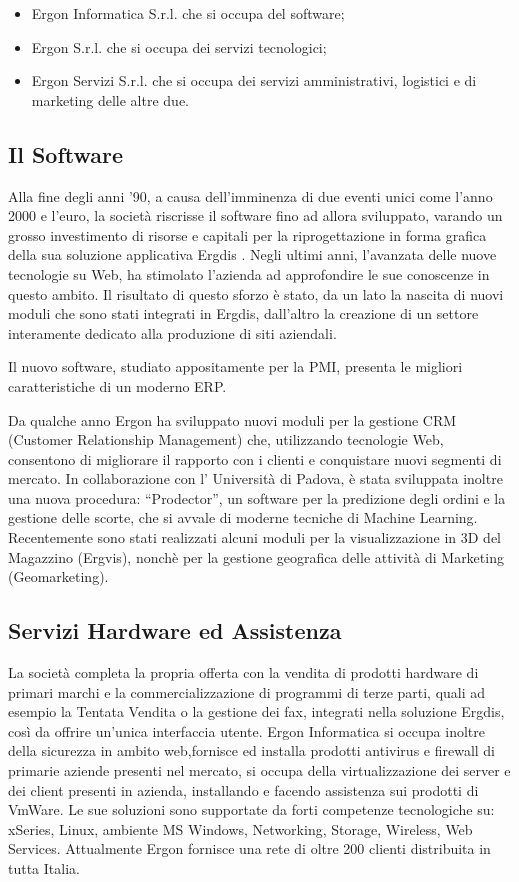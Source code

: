 \begin{itemize}
\item Ergon Informatica S.r.l. che si occupa del software;
\item Ergon S.r.l. che si occupa dei servizi tecnologici;
\item Ergon Servizi S.r.l. che si occupa dei servizi amministrativi, logistici e di marketing delle altre due.
\end{itemize}
  
\subsection*{Il Software}
Alla fine degli anni '90, a causa dell'imminenza di due eventi unici come l'anno 2000 e l'euro, la società riscrisse 
il software fino ad allora sviluppato, varando un grosso investimento di risorse e capitali per la riprogettazione in 
forma grafica della sua soluzione applicativa Ergdis .
Negli ultimi anni, l'avanzata delle nuove tecnologie su Web, ha stimolato l'azienda ad approfondire le sue conoscenze 
in questo ambito. Il risultato di questo sforzo è stato, da un lato la nascita di nuovi moduli che sono stati integrati 
in Ergdis, dall'altro la creazione di un settore interamente dedicato alla produzione di siti aziendali. 

Il nuovo software, studiato appositamente per la PMI, presenta le migliori caratteristiche di un moderno ERP.

Da qualche anno Ergon ha sviluppato nuovi moduli per la gestione CRM (Customer Relationship Management) che, 
utilizzando tecnologie Web, consentono di migliorare il rapporto con i clienti e conquistare nuovi segmenti di mercato. 
In collaborazione con l’ Università di Padova, è stata sviluppata inoltre una nuova procedura: “Prodector”, un software 
per la predizione degli ordini e la gestione delle scorte, che si avvale di moderne tecniche di Machine Learning.
Recentemente sono stati realizzati alcuni moduli per la visualizzazione in 3D del Magazzino (Ergvis), 
nonchè per la gestione geografica delle attività di Marketing (Geomarketing).

\subsection*{Servizi Hardware ed Assistenza}
La società completa la propria offerta con la vendita di prodotti hardware di primari marchi e la commercializzazione 
di programmi di terze parti, quali ad esempio la Tentata Vendita o la gestione dei fax,  integrati nella soluzione 
Ergdis, così da offrire un'unica interfaccia utente.
Ergon Informatica si occupa inoltre della sicurezza in ambito web,fornisce ed installa prodotti antivirus e firewall 
di primarie aziende presenti nel mercato, si occupa della virtualizzazione dei server e dei client presenti in azienda, 
installando e facendo assistenza sui prodotti di VmWare. 
Le sue soluzioni sono supportate da forti competenze tecnologiche su: xSeries, Linux, ambiente MS Windows, Networking, 
Storage, Wireless, Web Services.
Attualmente Ergon fornisce una rete di oltre 200 clienti distribuita in tutta Italia.
